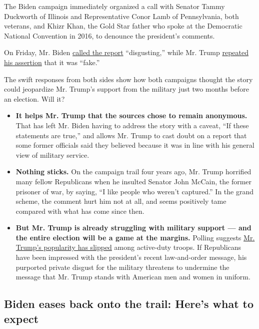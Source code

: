 The Biden campaign immediately organized a call with Senator Tammy
Duckworth of Illinois and Representative Conor Lamb of Pennsylvania,
both veterans, and Khizr Khan, the Gold Star father who spoke at the
Democratic National Convention in 2016, to denounce the president's
comments.

On Friday, Mr. Biden
\href{https://www.nytimes3xbfgragh.onion/2020/09/04/us/politics/biden-trump-soliders-insults.html}{called
the report} ``disgusting,'' while Mr. Trump
\href{https://www.nytimes3xbfgragh.onion/2020/09/04/us/politics/trump-veterans-losers.html}{repeated
his assertion} that it was ``fake.''

The swift responses from both sides show how both campaigns thought the
story could jeopardize Mr. Trump's support from the military just two
months before an election. Will it?

\begin{itemize}
\tightlist
\item
  \textbf{It helps Mr. Trump that the sources chose to remain
  anonymous.} That has left Mr. Biden having to address the story with a
  caveat, ``If these statements are true,'' and allows Mr. Trump to cast
  doubt on a report that some former officials said they believed
  because it was in line with his general view of military service.
\end{itemize}

\begin{itemize}
\item
  \textbf{Nothing sticks.} On the campaign trail four years ago, Mr.
  Trump horrified many fellow Republicans when he insulted Senator John
  McCain, the former prisoner of war, by saying, ``I like people who
  weren't captured.'' In the grand scheme, the comment hurt him not at
  all, and seems positively tame compared with what has come since then.
\item
  \textbf{But Mr. Trump is already struggling with military support ---
  and the entire election will be a game at the margins.} Polling
  suggests
  \href{https://www.nytimes3xbfgragh.onion/2020/09/04/us/politics/trump-military-vote-democrats.html}{Mr.
  Trump's popularity has slipped} among active-duty troops. If
  Republicans have been impressed with the president's recent
  law-and-order message, his purported private disgust for the military
  threatens to undermine the message that Mr. Trump stands with American
  men and women in uniform.
\end{itemize}

\hypertarget{biden-eases-back-onto-the-trail-heres-what-to-expect}{%
\subsection{Biden eases back onto the trail: Here's what to
expect}\label{biden-eases-back-onto-the-trail-heres-what-to-expect}}

